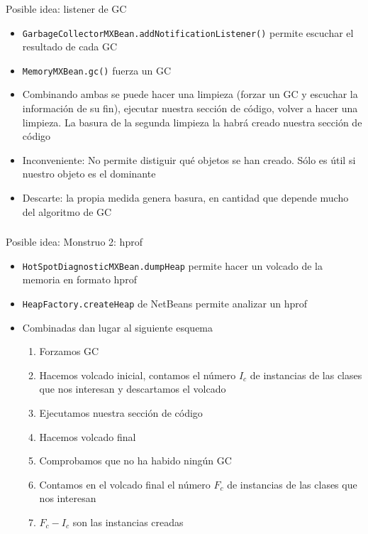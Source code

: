 \begin{frame}[fragile]
  \frametitle{\ft}
  \begin{block}{Posible idea: listener de GC}
    \begin{itemize}
    \item {\tt GarbageCollectorMXBean.addNotificationListener()}
      permite escuchar el resultado de cada GC
    \item {\tt MemoryMXBean.gc()} fuerza un GC
    \item Combinando ambas se puede hacer una limpieza
      (forzar un GC y escuchar la información de su fin),
      ejecutar nuestra sección de código,
      volver a hacer una limpieza.
      La basura de la segunda limpieza la habrá creado nuestra sección de código
    \item Inconveniente:
      No permite distiguir qué objetos se han creado. Sólo es útil
      si nuestro objeto es el dominante
    \item Descarte:
      la propia medida genera basura, en cantidad que depende mucho del
      algoritmo de GC
    \end{itemize}
  \end{block}
\end{frame}


\begin{frame}[fragile]
  \frametitle{\ft}
  \begin{block}{Posible idea: Monstruo 2: hprof}
    \begin{itemize}
    \item {\tt HotSpotDiagnosticMXBean.dumpHeap} permite hacer un volcado
      de la memoria en formato hprof
    \item {\tt HeapFactory.createHeap} de NetBeans
      permite analizar un hprof
    \item Combinadas dan lugar al siguiente esquema
      \begin{enumerate}
      \item Forzamos GC
      \item Hacemos volcado inicial,
        contamos el número $I_c$ de instancias de las clases que nos interesan
        y descartamos el volcado
      \item Ejecutamos nuestra sección de código
      \item Hacemos volcado final
      \item Comprobamos que no ha habido ningún GC
      \item Contamos en el volcado final el número $F_c$ de instancias de las
        clases que nos interesan
      \item $F_c - I_c$ son las instancias creadas
      \end{enumerate}
    \end{itemize}
  \end{block}
\end{frame}


